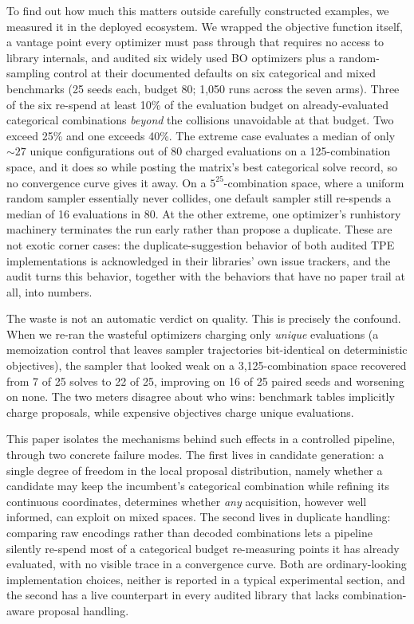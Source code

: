 \documentclass[%
 aip,
 amsmath,amssymb,
 floatfix,
 reprint,%
]{revtex4-1}
\begin{document}
To find out how much this matters outside carefully constructed examples, we
measured it in the deployed ecosystem. We wrapped the objective function
itself, a vantage point every optimizer must pass through that requires no
access to library internals, and audited six widely used BO optimizers plus a
random-sampling control at their documented defaults on six categorical and
mixed benchmarks (25 seeds each, budget 80; 1{,}050 runs across the seven
arms). Three of the six re-spend at least 10\% of the evaluation budget on
already-evaluated categorical combinations \emph{beyond} the collisions
unavoidable at that budget. Two exceed 25\% and one exceeds 40\%. The
extreme case evaluates a median of only ${\sim}27$ unique configurations out
of 80 charged evaluations on a 125-combination space, and it does so while
posting the matrix's best categorical solve record, so no convergence curve
gives it away. On a $5^{25}$-combination space, where a uniform random
sampler essentially never collides, one default sampler still re-spends a
median of 16 evaluations in 80. At the other extreme, one optimizer's
runhistory machinery terminates the run early rather than propose a
duplicate. These are not exotic corner cases: the duplicate-suggestion
behavior of both audited TPE implementations is acknowledged in their
libraries' own issue trackers, and the audit turns this behavior, together
with the behaviors that have no paper trail at all, into numbers.

The waste is not an automatic verdict on quality. This is precisely the
confound. When we re-ran the wasteful optimizers charging only \emph{unique}
evaluations (a memoization control that leaves sampler trajectories
bit-identical on deterministic objectives), the sampler that looked weak on
a 3{,}125-combination space recovered from 7 of 25 solves to 22 of 25,
improving on 16 of 25 paired seeds and worsening on none. The two meters disagree about who wins: benchmark tables implicitly
charge proposals, while expensive objectives charge unique evaluations.

This paper isolates the mechanisms behind such effects in a controlled
pipeline, through two concrete failure modes. The first lives in candidate
generation: a single degree of freedom in the local proposal distribution,
namely whether a candidate may keep the incumbent's categorical combination
while refining its continuous coordinates, determines whether \emph{any}
acquisition, however well informed, can exploit on mixed spaces. The second
lives in duplicate handling: comparing raw encodings rather than decoded
combinations lets a pipeline silently re-spend most of a categorical budget
re-measuring points it has already evaluated, with no visible trace in a
convergence curve. Both are ordinary-looking implementation choices, neither
is reported in a typical experimental section, and the second has a live
counterpart in every audited library that lacks combination-aware proposal
handling.
\end{document}
